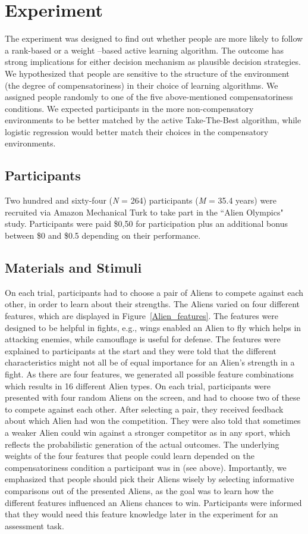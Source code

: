 \documentclass[10pt,letterpaper]{article}
\begin{document}
\section{Experiment}
The experiment was designed to find out whether people are more likely to follow a rank-based or a weight –based active learning algorithm. The outcome has strong implications for either decision mechanism as plausible decision strategies. We hypothesized that people are sensitive to the structure of the environment (the degree of compensatoriness) in their choice of learning algorithms. We assigned people randomly to one of the five above-mentioned compensatoriness conditions. We expected participants in the more non-compensatory environments to be better matched by the active Take-The-Best algorithm, while logistic regression would better match their choices in the compensatory environments.   

\subsection{Participants}
Two hundred and sixty-four (\textit{N} = 264) participants (\textit{M} = 35.4 years) were recruited via Amazon Mechanical Turk to take part in the ``Alien Olympics" study. Participants were paid \$0,50 for participation plus an additional bonus between \$0 and  \$0.5 depending on their performance. %
\subsection{Materials and Stimuli}
On each trial, participants had to choose a pair of Aliens to compete against each other, in order to learn about their strengths. The Aliens varied on four different features, which are displayed in Figure~\ref{Alien_features}. The features were designed to be helpful in fights, e.g., wings enabled an Alien to fly which helps in attacking enemies, while camouflage is useful for defense. The features were explained to participants at the start and they were told that the different characteristics might not all be of equal importance for an Alien’s strength in a fight. As there are four features, we generated all possible feature combinations which results in 16 different Alien types. On each trial, participants were presented with four random Aliens on the screen, and had to choose two of these to compete against each other. After selecting a pair, they received feedback about which Alien had won the competition. They were also told that sometimes a weaker Alien could win against a stronger competitor as in any sport, which reflects the probabilistic generation of the actual outcomes. The underlying weights of the four features that people could learn depended on the compensatoriness condition a participant was in (see above). Importantly, we emphasized that people should pick their Aliens wisely by selecting informative comparisons out of the presented Aliens, as the goal was to learn how the different features influenced an Aliens chances to win. Participants were informed that they would need this feature knowledge later in the experiment for an assessment task.
\end{document}
